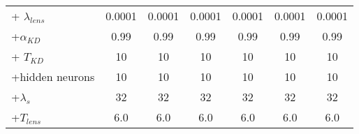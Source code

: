 \begin{table}[h]
\begin{center}
\begin{tabular}{l|c|c|c|c|c|c}
       
       \quad + $\lambda_{lens}$ & 0.0001 & 0.0001 & 0.0001 & 0.0001 & 0.0001 & 0.0001 \\
    
       \quad +$\alpha_{KD}$ & 0.99 & 0.99 & 0.99 & 0.99 & 0.99 & 0.99 \\
       \quad + $T_{KD}$ & 10 & 10 & 10 & 10 &10 & 10 \\
       \quad +hidden neurons & 10 & 10 & 10 & 10 &10 & 10 \\
       \quad +$\lambda_s$ & 32 & 32 & 32 & 32 & 32 & 32 \\
       \quad +$T_{lens}$ & 6.0 & 6.0 & 6.0 & 6.0 & 6.0 & 6.0 \\
\bottomrule
\end{tabular}
\end{center}
\end{table}

